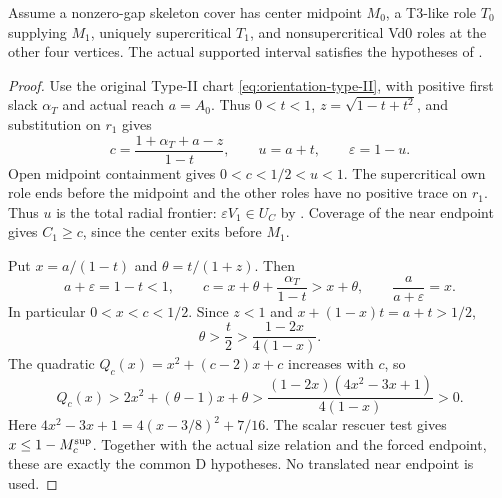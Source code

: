 \begin{lemma}
\label{lem:appendix-t3-supported-tail}
Assume a nonzero-gap skeleton cover has center midpoint $M_0$, a T3-like
role $T_0$ supplying $M_1$, uniquely supercritical $T_1$, and nonsupercritical
Vd0 roles at the other four vertices. The actual supported interval
satisfies the hypotheses of .
\end{lemma}
\begin{proof}
Use the original Type-II chart \eqref{eq:orientation-type-II}, with
positive first slack $\alpha_T$ and actual reach $a=A_0$.
Thus $0<t<1$, $z=\sqrt{1-t+t^2}$, and substitution on $r_1$ gives
\begin{equation}
 c=\frac{1+\alpha_T+a-z}{1-t},\qquad
 u=a+t,\qquad \varepsilon=1-u.
 \label{eq:t3-actual-supported-interval}
\end{equation}
Open midpoint containment gives $0<c<1/2<u<1$.
The supercritical own role ends before the midpoint and the other roles
have no positive trace on $r_1$. Thus $u$ is the total radial frontier:
$\varepsilon V_1\in U_C$ by .
Coverage of the near endpoint gives $C_1\ge c$, since the center exits
before $M_1$.

Put $x=a/(1-t)$ and $\theta=t/(1+z)$. Then
\begin{equation}
 a+\varepsilon=1-t<1,\qquad
 c=x+\theta+\frac{\alpha_T}{1-t}>x+\theta,\qquad
 \frac a{a+\varepsilon}=x.
 \label{eq:t3-actual-ratio}
\end{equation}
In particular $0<x<c<1/2$. Since $z<1$ and
$x+(1-x)t=a+t>1/2$,
\[
 \theta>\frac t2>\frac{1-2x}{4(1-x)}.
\]
The quadratic $Q_c(x)=x^2+(c-2)x+c$ increases with $c$, so
\[
 Q_c(x)>2x^2+(\theta-1)x+\theta
 >\frac{(1-2x)(4x^2-3x+1)}{4(1-x)}>0.
\]
Here $4x^2-3x+1=4(x-3/8)^2+7/16$.
The scalar rescuer test  gives $x\le1-M_c^{\rm sup}$.
Together with the actual size relation and the forced endpoint, these
are exactly the common D hypotheses. No translated near endpoint is used.
\end{proof}


